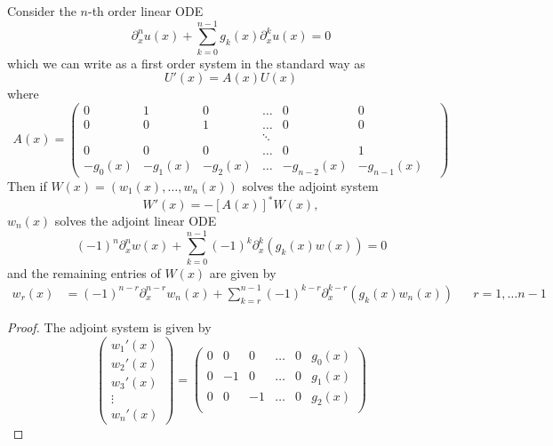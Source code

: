 \documentclass[thesis.tex]{subfiles}
\begin{document}
\begin{lemma}\label{adjointlemma}
Consider the $n$-th order linear ODE 
\begin{equation}\label{linODE}
\partial_x^n u(x) + \sum_{k=0}^{n-1}g_k(x) \partial_x^k u(x) = 0
\end{equation}
which we can write as a first order system in the standard way as
\begin{equation}\label{linODEsys}
U'(x) = A(x)U(x)
\end{equation}
where
\begin{equation}\label{Axform}
A(x) = \begin{pmatrix}
0 & 1 & 0 & \dots & 0 & 0 \\
0 & 0 & 1 & \dots & 0 & 0 \\
& &  & \ddots &  & & \\
0 & 0 & 0 & \dots & 0 & 1 \\
-g_0(x) & -g_1(x) & -g_2(x) &
 \dots & -g_{n-2}(x) & -g_{n-1}(x)
\end{pmatrix}
\end{equation}
Then if $W(x) = (w_1(x), \dots, w_n(x))$ solves the adjoint system
\begin{equation}\label{adjODEsys}
W'(x) = -[A(x)]^* W(x),
\end{equation}
$w_n(x)$ solves the adjoint linear ODE
\begin{equation}\label{adjODE}
(-1)^n \partial_x^n w(x) + \sum_{k=0}^{n-1} (-1)^k \partial_x^k( g_k(x) w(x)) = 0
\end{equation}
and the remaining entries of $W(x)$ are given by
\begin{align}\label{adjWform}
w_r(x) &= (-1)^{n-r} \partial_x^{n-r}w_n(x) + \sum_{k=r}^{n-1} (-1)^{k-r} \partial_x^{k-r}(g_k(x) w_n(x)) && r = 1, \dots n-1
\end{align}
\begin{proof}
The adjoint system is given by
\begin{equation*}
\begin{pmatrix}
w_1'(x) \\ w_2'(x) \\ w_3'(x) \\ \vdots \\ w_n'(x)
\end{pmatrix} = \begin{pmatrix}
0 &  0 & 0  & \dots & 0 & g_0(x) \\
0 & -1 & 0  & \dots & 0 & g_1(x) \\
0 &  0 & -1 & \dots & 0 & g_2(x) \\

\end{pmatrix}
\end{equation*}
\end{proof}
\end{lemma}
\end{document}
